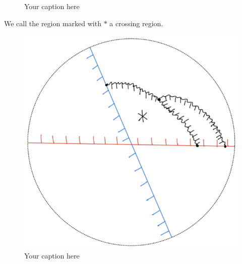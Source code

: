 \begin{definition}
\begin{enumerate}[label = (\roman*)]
\begin{itemize}
\begin{figure}[H]
    \caption{Your caption here}
    \label{fig:your-label}
\end{figure}
We call the region marked with $*$ a crossing region.
\begin{figure}[H] 
    \centering
    \includegraphics[scale = 0.95]{diagrams/local_systems_on_as_diagrams/8.png} 
    \caption{Your caption here}
    \label{fig:your-label}
\end{figure}
\end{itemize}


\end{enumerate}
\end{definition}
